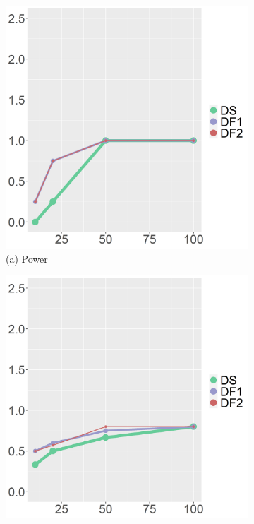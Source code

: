 \captionsetup[subfigure]{labelformat=empty}
\begin{figure}[ht!]
\centering
\begin{subfigure}[b]{.32\columnwidth} 
    \includegraphics[width=\columnwidth]{../../plot/power_1.png}
    \caption{(a) Power}
    \label{fig:power}
\end{subfigure}
\hfill
\centering
\begin{subfigure}[b]{.32\columnwidth} 
    \includegraphics[width=\columnwidth]{../../plot/precision_1.png}

\end{subfigure}
\end{figure}

